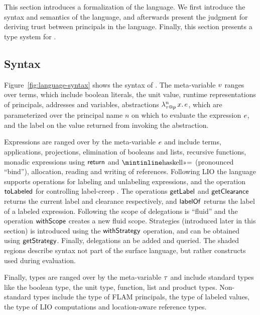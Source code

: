 This section introduces a formalization of the \lang{} language. We first introduce the syntax and semantics of the language, and afterwards present the judgment for deriving trust between principals in the language. Finally, this section presents a type system for \lang.

\subsection{Syntax}

Figure~\ref{fig:language-syntax} shows the syntax of \lang. The meta-variable $v$ ranges over terms, which include boolean literals, the unit value, runtime representations of principals, addresses and variables, abstractions $\lambda^{n}_{\tau \mathbin{@} p}\,x.\,e$, which are parameterized over the principal name $n$ on which to evaluate the expression $e$, and the label on the value returned from invoking the abstraction.

Expressions are ranged over by the meta-variable $e$ and include terms, applications, projections, elimination of booleans and lists, recursive functions, monadic expressions using $\mathsf{return}$ and $\bindop$ (pronounced ``bind''), allocation, reading and writing of references. Following LIO \cite{SRMMlio} the language supports operations for labeling and unlabeling expressions, and the operation $\mathsf{toLabeled}$ for controlling label-creep \cite{where do they introduce label-creep?}. The operations $\mathsf{getLabel}$ and $\mathsf{getClearance}$ returns the current label and clearance respectively, and $\mathsf{labelOf}$ returns the label of a labeled expression. Following \cite{Extensible Access Control with Authorization Contracts} the scope of delegations is ``fluid'' and the operation $\mathsf{withScope}$ creates a new fluid scope. Strategies (introduced later in this section) is introduced using the $\mathsf{withStrategy}$ operation, and can be obtained using $\mathsf{getStrategy}$. Finally, delegations an be added and queried. The shaded regions describe syntax not part of the surface language, but rather constructs used during evaluation.

Finally, types are ranged over by the meta-variable $\tau$ and include standard types like the boolean type, the unit type, function, list and product types. Non-standard types include the type of FLAM principals, the type of labeled values, the type of LIO computations and location-aware reference types.

